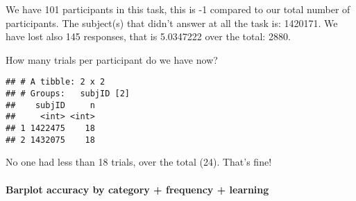 \documentclass[
]{article}
\newenvironment{Shaded}{\begin{snugshade}}{\end{snugshade}}
\newcommand{\DecValTok}[1]{\textcolor[rgb]{0.00,0.00,0.81}{#1}}
\newcommand{\KeywordTok}[1]{\textcolor[rgb]{0.13,0.29,0.53}{\textbf{#1}}}
\newcommand{\NormalTok}[1]{#1}
\newcommand{\OperatorTok}[1]{\textcolor[rgb]{0.81,0.36,0.00}{\textbf{#1}}}
\newcommand{\StringTok}[1]{\textcolor[rgb]{0.31,0.60,0.02}{#1}}
\begin{document}
\begin{Shaded}
\end{Shaded}

We have 101 participants in this task, this is -1 compared to our total
number of participants. The subject(s) that didn't answer at all the
task is: 1420171. We have lost also 145 responses, that is 5.0347222
over the total: 2880.

How many trials per participant do we have now?

\begin{Shaded}
\end{Shaded}

\begin{verbatim}
## # A tibble: 2 x 2
## # Groups:   subjID [2]
##    subjID     n
##     <int> <int>
## 1 1422475    18
## 2 1432075    18
\end{verbatim}

No one had less than 18 trials, over the total (24). That's fine!

\hypertarget{barplot-accuracy-by-category-frequency-learning}{%
\paragraph{Barplot accuracy by category + frequency +
learning}\label{barplot-accuracy-by-category-frequency-learning}}
\end{document}
